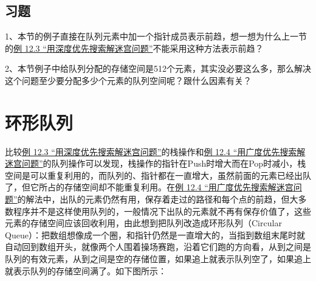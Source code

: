 \subsection*{习题}
%


1、本节的例子直接在队列元素中加一个指针成员表示前趋，想一想为什么上一节的\hyperlink{db.ch12s03.id2750166}{例 12.\BookSplit{}3 “用深度优先搜索解迷宫问题”}不能采用这种方法表示前趋？



2、本节例子中给队列分配的存储空间是512个元素，其实没必要这么多，那么解决这个问题至少要分配多少个元素的队列空间呢？跟什么因素有关？




\section{环形队列}
%
比较\hyperlink{db.ch12s03.id2750166}{例 12.\BookSplit{}3 “用深度优先搜索解迷宫问题”}的栈操作和\hyperlink{db.ch12s04.id2750660}{例 12.\BookSplit{}4 “用广度优先搜索解迷宫问题”}的队列操作可以发现，栈操作的指针在Push时增大而在Pop时减小，栈空间是可以重复利用的，而队列的、指针都在一直增大，虽然前面的元素已经出队了，但它所占的存储空间却不能重复利用。在\hyperlink{db.ch12s04.id2750660}{例 12.\BookSplit{}4 “用广度优先搜索解迷宫问题”}的解法中，出队的元素仍然有用，保存着走过的路径和每个点的前趋，但大多数程序并不是这样使用队列的，一般情况下出队的元素就不再有保存价值了，这些元素的存储空间应该回收利用，由此想到把队列改造成环形队列（Circular Queue）：把数组想像成一个圈，和指针仍然是一直增大的，当指到数组末尾时就自动回到数组开头，就像两个人围着操场赛跑，沿着它们跑的方向看，从到之间是队列的有效元素，从到之间是空的存储位置，如果追上就表示队列空了，如果追上就表示队列的存储空间满了。如下图所示：



